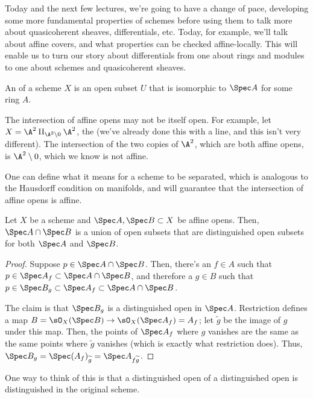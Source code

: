 Today and the next few lectures, we're going to have a change of pace, developing some more fundamental properties
of schemes before using them to talk more about quasicoherent sheaves, differentials, etc. Today, for example,
we'll talk about affine covers, and what properties can be checked affine-locally. This will enable us to turn our
story about differentials from one about rings and modules to one about schemes and quasicoherent sheaves.
\begin{defn}
An  of a scheme \(X\) is an open subset \(U\) that is isomorphic to \(\Spec A\) for some ring
\(A\).
\end{defn}
The intersection of affine opens may not be itself open. For example, let \(X = \A^2\amalg_{\A^2\setminus 0}\A^2\),
the  (we've already done this with a line, and this isn't very different). The
intersection of the two copies of \(\A^2\), which are both affine opens, is \(\A^2\setminus 0\), which we know is
not affine.

One can define what it means for a scheme to be separated, which is analogous to the Hausdorff condition on
manifolds, and will guarantee that the intersection of affine opens is affine.
\begin{prop}
\label{affineintersprop}
Let \(X\) be a scheme and \(\Spec A,\Spec B\subset X\) be affine opens. Then, \(\Spec A\cap\Spec B\) is a union of
open subsets that are distinguished open subsets for both \(\Spec A\) and \(\Spec B\).
\end{prop}
\begin{proof}
Suppose \(p\in\Spec A\cap\Spec B\). Then, there's an \(f\in A\) such that \(p\in\Spec A_f\subset\Spec A\cap\Spec
B\), and therefore a \(g\in B\) such that \(p\in\Spec B_g\subset\Spec A_f\subset\Spec A\cap\Spec B\).

The claim is that \(\Spec B_g\) is a distinguished open in \(\Spec A\). Restriction defines a map \(B = \sO_X(\Spec
B)\to\sO_X(\Spec A_f) = A_f\); let \(\widetilde g\) be the image of \(g\) under this map. Then, the points of
\(\Spec A_f\) where \(g\) vanishes are the same as the same points where \(\widetilde g\) vanishes (which is
exactly what restriction does). Thus, \(\Spec B_g = \Spec (A_f)_{\widetilde g} = \Spec A_{f\widetilde g}\).
\end{proof}
One way to think of this is that a distinguished open of a distinguished open is distinguished in the original
scheme.

